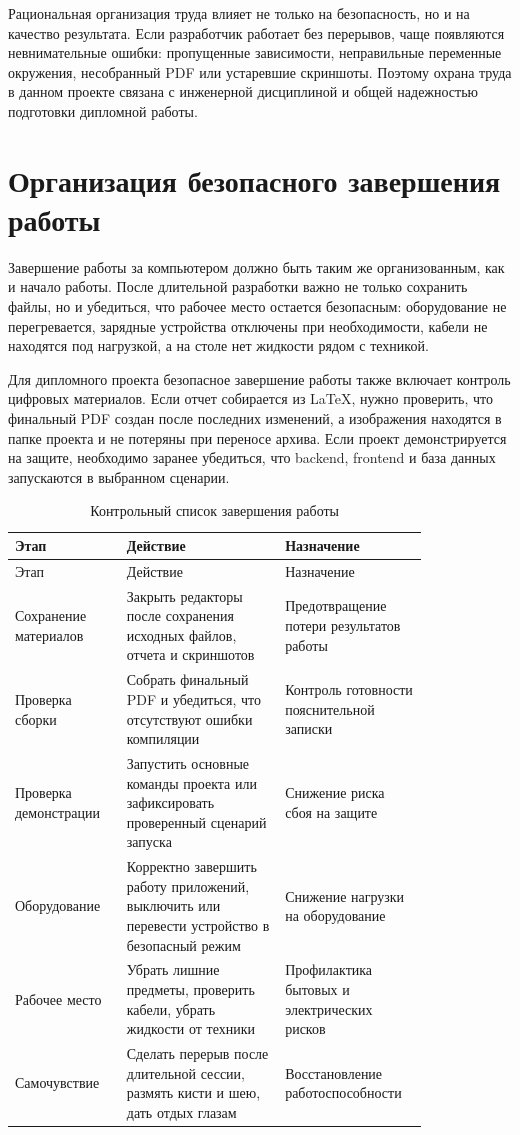 Рациональная организация труда влияет не только на безопасность, но и на качество результата. Если разработчик работает без перерывов, чаще появляются невнимательные ошибки: пропущенные зависимости, неправильные переменные окружения, несобранный PDF или устаревшие скриншоты. Поэтому охрана труда в данном проекте связана с инженерной дисциплиной и общей надежностью подготовки дипломной работы.


\section{Организация безопасного завершения работы}

Завершение работы за компьютером должно быть таким же организованным, как и начало работы. После длительной разработки важно не только сохранить файлы, но и убедиться, что рабочее место остается безопасным: оборудование не перегревается, зарядные устройства отключены при необходимости, кабели не находятся под нагрузкой, а на столе нет жидкости рядом с техникой.


Для дипломного проекта безопасное завершение работы также включает контроль цифровых материалов. Если отчет собирается из LaTeX, нужно проверить, что финальный PDF создан после последних изменений, а изображения находятся в папке проекта и не потеряны при переносе архива. Если проект демонстрируется на защите, необходимо заранее убедиться, что backend, frontend и база данных запускаются в выбранном сценарии.


\noindent\scriptsize
\setlength{\tabcolsep}{3pt}
\renewcommand{\arraystretch}{1.18}
\begin{longtable}{|>{\RaggedRight\arraybackslash}p{0.24\linewidth}|>{\RaggedRight\arraybackslash}p{0.34\linewidth}|>{\RaggedRight\arraybackslash}p{0.24\linewidth}|}
\caption{Контрольный список завершения работы}\label{tab:3-3}\\
\hline
Этап & Действие & Назначение\\ \hline
\endfirsthead
\hline
Этап & Действие & Назначение\\ \hline
\endhead
Сохранение материалов & Закрыть редакторы после сохранения исходных файлов, отчета и скриншотов & Предотвращение потери результатов работы\\ \hline
Проверка сборки & Собрать финальный PDF и убедиться, что отсутствуют ошибки компиляции & Контроль готовности пояснительной записки\\ \hline
Проверка демонстрации & Запустить основные команды проекта или зафиксировать проверенный сценарий запуска & Снижение риска сбоя на защите\\ \hline
Оборудование & Корректно завершить работу приложений, выключить или перевести устройство в безопасный режим & Снижение нагрузки на оборудование\\ \hline
Рабочее место & Убрать лишние предметы, проверить кабели, убрать жидкости от техники & Профилактика бытовых и электрических рисков\\ \hline
Самочувствие & Сделать перерыв после длительной сессии, размять кисти и шею, дать отдых глазам & Восстановление работоспособности\\ \hline
\end{longtable}
\normalsize


